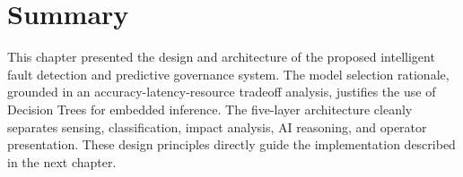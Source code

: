 \section{Summary}

This chapter presented the design and architecture of the proposed intelligent fault detection and predictive governance system. The model selection rationale, grounded in an accuracy-latency-resource tradeoff analysis, justifies the use of Decision Trees for embedded inference. The five-layer architecture cleanly separates sensing, classification, impact analysis, AI reasoning, and operator presentation. These design principles directly guide the implementation described in the next chapter.
